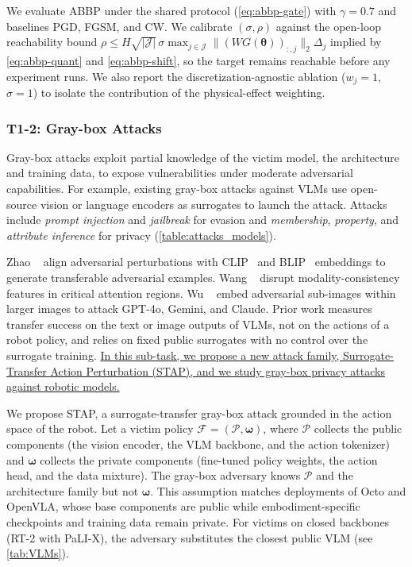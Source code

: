  We evaluate ABBP under the shared protocol (\autoref{eq:abbp-gate}) with $\gamma{=}0.7$ and baselines PGD, FGSM, and CW. We calibrate $(\sigma,\rho)$ against the open-loop reachability bound $\rho\le H\sqrt{|\mathcal{J}|}\,\sigma\max_{j\in\mathcal{J}}\|(WG(\bm{\theta}))_{:,j}\|_{2}\Delta_{j}$ implied by \autoref{eq:abbp-quant} and \autoref{eq:abbp-shift}, so the target remains reachable before any experiment runs. We also report the discretization-agnostic ablation ($w_j{=}1$, $\sigma{=}1$) to isolate the contribution of the physical-effect weighting.


\subsubsection{T1-2: Gray-box Attacks} \label{sec:t1_2}
Gray-box attacks exploit partial knowledge of the victim model, \eg the architecture and training data, to expose vulnerabilities under moderate adversarial capabilities. For example, existing gray-box attacks against VLMs use open-source vision or language encoders as surrogates to launch the attack.
Attacks include \emph{prompt injection} and \emph{jailbreak} for evasion and \emph{membership}, \emph{property}, and \emph{attribute inference} for privacy (\autoref{table:attacks_models}).

 Zhao \etal~\cite{zhao2024evaluating} align adversarial perturbations with CLIP~\cite{radford2021learning} and BLIP~\cite{li2022blip} embeddings to generate transferable adversarial examples. Wang \etal~\cite{wang2024transferable} disrupt modality-consistency features in critical attention regions. Wu \etal~\cite{wu2024adversarial} embed adversarial sub-images within larger images to attack GPT-4o, Gemini, and Claude. Prior work measures transfer success on the text or image outputs of VLMs, not on the actions of a robot policy, and relies on fixed public surrogates with no control over the surrogate training.
\ul{In this sub-task, we propose a new attack family, Surrogate-Transfer Action Perturbation (STAP), and we study gray-box privacy attacks against robotic models.}

 We propose STAP, a surrogate-transfer gray-box attack grounded in the action space of the robot. Let a victim policy  $\mathcal{F}=(\mathcal{P},\bm{\omega})$, where $\mathcal{P}$ collects the public components (\eg the vision encoder, the VLM backbone, and the action tokenizer) and $\bm{\omega}$ collects the private components (\eg fine-tuned policy weights, the action head, and the data mixture). The gray-box adversary knows $\mathcal{P}$ and the architecture family but not $\bm{\omega}$. 
This assumption matches deployments of Octo and OpenVLA, whose base components are public while embodiment-specific checkpoints and training data remain private. For victims on closed backbones (\eg RT-2 with PaLI-X), the adversary substitutes the closest public VLM (see \autoref{tab:VLMs}). %

